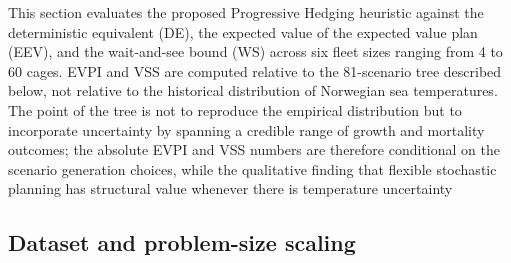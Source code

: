 \documentclass[12pt,a4paper]{article}
\begin{document}
This section evaluates the proposed Progressive Hedging heuristic against
the deterministic equivalent (DE), the expected value of the expected value plan (EEV), and the
wait-and-see bound (WS) across six fleet sizes ranging from 4 to 60 cages.
EVPI and VSS are computed relative to the 81-scenario tree described
below, not relative to the historical distribution of Norwegian sea
temperatures. The point of the tree is not to reproduce the empirical
distribution but to incorporate uncertainty by spanning a credible range
of growth and mortality outcomes; the absolute EVPI and VSS numbers are
therefore conditional on the scenario generation choices, while the
qualitative finding that flexible stochastic planning has structural
value whenever there is temperature uncertainty 


\subsection{Dataset and problem-size scaling}
\label{sec:data}
\end{document}
